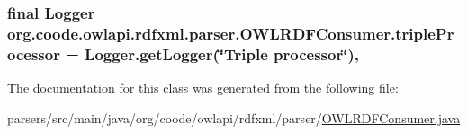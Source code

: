 \hypertarget{classorg_1_1coode_1_1owlapi_1_1rdfxml_1_1parser_1_1_o_w_l_r_d_f_consumer_a6b5ac62331b1740af566b9070d9e0e54}{
\subsubsection[{triple\-Processor}]{\setlength{\rightskip}{0pt plus 5cm}final Logger org.\-coode.\-owlapi.\-rdfxml.\-parser.\-O\-W\-L\-R\-D\-F\-Consumer.\-triple\-Processor = Logger.\-get\-Logger(\char`\"{}Triple processor\char`\"{})\hspace{0.3cm}{\ttfamily [static]}, {\ttfamily [private]}}}\label{classorg_1_1coode_1_1owlapi_1_1rdfxml_1_1parser_1_1_o_w_l_r_d_f_consumer_a6b5ac62331b1740af566b9070d9e0e54}


The documentation for this class was generated from the following file\-:\begin{DoxyCompactItemize}
\item 
parsers/src/main/java/org/coode/owlapi/rdfxml/parser/\hyperlink{_o_w_l_r_d_f_consumer_8java}{O\-W\-L\-R\-D\-F\-Consumer.\-java}\end{DoxyCompactItemize}

